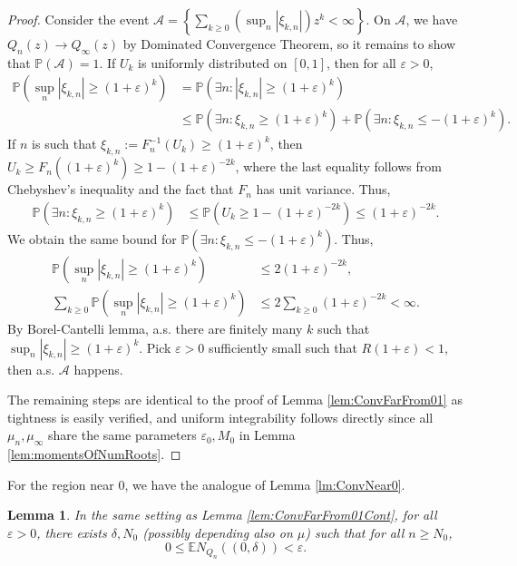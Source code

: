 \documentclass[12pt, reqno]{amsart}
\theoremstyle{plain}
\newtheorem{lemma}[theorem]{Lemma}
\theoremstyle{definition}
\renewcommand\P{{\mathbb{P}}}
\newcommand\E{{\mathbb{E}}}
\begin{document}
\begin{proof}
	Consider the event $\mathcal  A = \left\{\sum_{k \ge 0} \left(\sup_n |\xi_{k, n}|\right) z^k < \infty \right\}$. On $\mathcal A$, we have $Q_n (z) \to Q_\infty(z)$ by Dominated Convergence Theorem, so it remains to show that $\P(\mathcal A) = 1$. If $U_k$ is uniformly distributed on $[0, 1]$, then for all $\varepsilon > 0$, 
	\begin{align*}
		\P\left( \sup_n |\xi_{k, n}| \ge (1 + \varepsilon)^k  \right) &= \P\left( \exists n: |\xi_{k, n}| \ge (1 + \varepsilon)^k \right) \\
		&\le\P\left( \exists n: \xi_{k, n} \ge (1 + \varepsilon)^k \right) + \P\left( \exists n: \xi_{k, n} \le - (1 + \varepsilon)^k \right).
\end{align*}
If $n$ is such that $\xi_{k, n} := F_n^{-1}(U_k) \ge (1 + \varepsilon)^k$, then $U_k \ge F_n((1 + \varepsilon)^k) \ge 1 - (1 + \varepsilon)^{-2k}$, where the last equality follows from Chebyshev's inequality and the fact that $F_n$ has unit variance. Thus,
\begin{align*}
		\P\left( \exists n: \xi_{k, n} \ge (1 + \varepsilon)^k \right) &\le \P\left( U_k \ge  1 - (1 + \varepsilon)^{-2k}  \right) \le (1 + \varepsilon)^{-2k}. 
\end{align*}
We obtain the same bound for $\P\left( \exists n: \xi_{k, n} \le - (1 + \varepsilon)^k \right)$. Thus,
\begin{align*}
		\P\left( \sup_n |\xi_{k, n}| \ge (1 + \varepsilon)^k  \right) &\le 2( 1+ \varepsilon)^{-2k},  \\ 
		\sum_{k \ge 0 }\P\left( \sup_n |\xi_{k, n}| \ge (1 + \varepsilon)^k  \right) &\le 2 \sum_{k \ge 0}( 1+ \varepsilon)^{-2k} < \infty.
	\end{align*}
	By Borel-Cantelli lemma, a.s. there are finitely many $k$ such that $\sup_n |\xi_{k, n}| \ge (1 + \varepsilon)^k$. Pick $\varepsilon > 0$ sufficiently small such that $R (1 + \varepsilon) < 1$, then a.s. $\mathcal A$ happens.
	
	The remaining steps are identical to the proof of Lemma \ref{lem:ConvFarFrom01} as tightness is easily verified, and uniform integrability follows directly since all $\mu_n, \mu_\infty$ share the same parameters $\varepsilon_0, M_0$ in Lemma \ref{lem:momentsOfNumRoots}.
\end{proof}

For the region near $0$, we have the analogue of Lemma \ref{lm:ConvNear0}.
\begin{lemma}\label{lm:small}
	In the same setting as Lemma \ref{lem:ConvFarFrom01Cont}, for all $\varepsilon > 0$, there exists $\delta, N_0$ (possibly depending also on $\mu$) such that for all $n \ge N_0$, $$ 0\le \E N_{Q_n}((0, \delta)) < \varepsilon.$$
\end{lemma}
\end{document}
